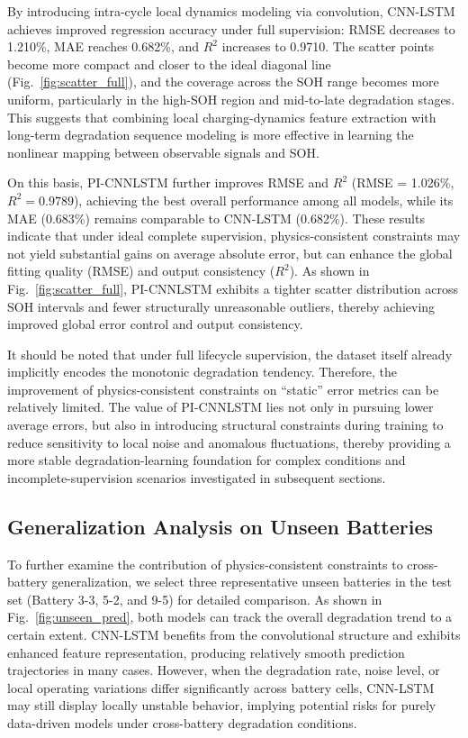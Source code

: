 \documentclass[a4paper,fleqn]{cas-dc}
\begin{document}
By introducing intra-cycle local dynamics modeling via convolution, CNN-LSTM achieves improved regression accuracy under full supervision: RMSE decreases to 1.210\%, MAE reaches 0.682\%, and $R^2$ increases to 0.9710. The scatter points become more compact and closer to the ideal diagonal line (Fig.~\ref{fig:scatter_full}), and the coverage across the SOH range becomes more uniform, particularly in the high-SOH region and mid-to-late degradation stages. This suggests that combining local charging-dynamics feature extraction with long-term degradation sequence modeling is more effective in learning the nonlinear mapping between observable signals and SOH.

On this basis, PI-CNNLSTM further improves RMSE and $R^2$ (RMSE = 1.026\%, $R^2=0.9789$), achieving the best overall performance among all models, while its MAE (0.683\%) remains comparable to CNN-LSTM (0.682\%). These results indicate that under ideal complete supervision, physics-consistent constraints may not yield substantial gains on average absolute error, but can enhance the global fitting quality (RMSE) and output consistency ($R^2$). As shown in Fig.~\ref{fig:scatter_full}, PI-CNNLSTM exhibits a tighter scatter distribution across SOH intervals and fewer structurally unreasonable outliers, thereby achieving improved global error control and output consistency.

It should be noted that under full lifecycle supervision, the dataset itself already implicitly encodes the monotonic degradation tendency. Therefore, the improvement of physics-consistent constraints on ``static'' error metrics can be relatively limited. The value of PI-CNNLSTM lies not only in pursuing lower average errors, but also in introducing structural constraints during training to reduce sensitivity to local noise and anomalous fluctuations, thereby providing a more stable degradation-learning foundation for complex conditions and incomplete-supervision scenarios investigated in subsequent sections.

\subsection{Generalization Analysis on Unseen Batteries}
\label{subsec:unseen}

To further examine the contribution of physics-consistent constraints to cross-battery generalization, we select three representative unseen batteries in the test set (Battery 3-3, 5-2, and 9-5) for detailed comparison. As shown in Fig.~\ref{fig:unseen_pred}, both models can track the overall degradation trend to a certain extent. CNN-LSTM benefits from the convolutional structure and exhibits enhanced feature representation, producing relatively smooth prediction trajectories in many cases. However, when the degradation rate, noise level, or local operating variations differ significantly across battery cells, CNN-LSTM may still display locally unstable behavior, implying potential risks for purely data-driven models under cross-battery degradation conditions.
\end{document}
